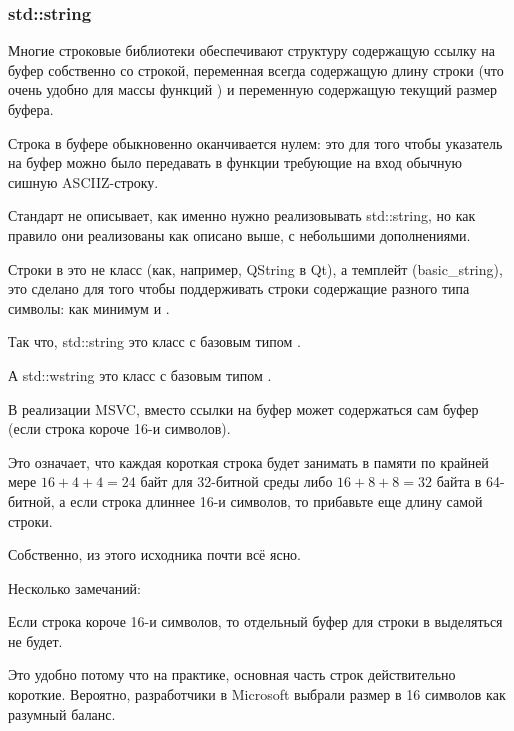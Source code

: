 \subsubsection{std::string}
\label{std_string}


Многие строковые библиотеки  обеспечивают структуру содержащую ссылку 
на буфер собственно со строкой, переменная всегда содержащую длину строки 
(что очень удобно для массы функций ) и переменную содержащую текущий размер буфера.

Строка в буфере обыкновенно оканчивается нулем: это для того чтобы указатель на буфер можно было
передавать в функции требующие на вход обычную сишную \ac{ASCIIZ}-строку.

Стандарт \Cpp не описывает, как именно нужно реализовывать std::string,
но как правило они реализованы как описано выше, с небольшими дополнениями.

Строки в \Cpp это не класс (как, например, QString в Qt), а темплейт (basic\_string), 
это сделано для того чтобы поддерживать 
строки содержащие разного типа символы: как минимум \Tchar и .

Так что, std::string это класс с базовым типом \Tchar.

А std::wstring это класс с базовым типом .


В реализации MSVC, вместо ссылки на буфер может содержаться сам буфер (если строка короче 16-и символов).

Это означает, что каждая короткая строка будет занимать в памяти по крайней мере $16 + 4 + 4 = 24$ 
байт для 32-битной среды либо $16 + 8 + 8 = 32$ 
байта в 64-битной, а если строка длиннее 16-и символов, то прибавьте еще длину самой строки.



Собственно, из этого исходника почти всё ясно.

Несколько замечаний:

Если строка короче 16-и символов, 
то отдельный буфер для строки в  выделяться не будет.

Это удобно потому что на практике, основная часть строк действительно короткие.
Вероятно, разработчики в Microsoft выбрали размер в 16 символов как разумный баланс.


